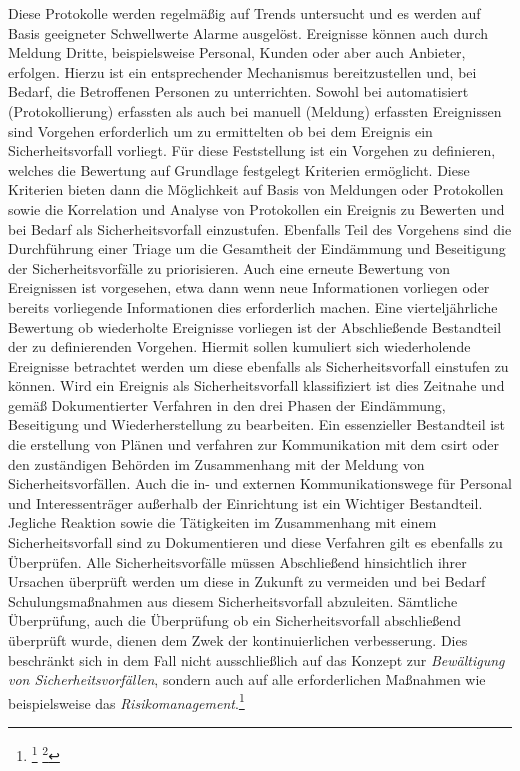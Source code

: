 \documentclass[11pt,a4paper,hidelinks]{article}   %
\begin{document}
            Diese Protokolle werden regelmäßig auf Trends untersucht und es werden auf Basis geeigneter Schwellwerte Alarme ausgelöst. Ereignisse können auch durch Meldung Dritte, beispielsweise Personal, Kunden oder aber auch Anbieter, erfolgen. Hierzu ist ein entsprechender Mechanismus bereitzustellen und, bei Bedarf, die Betroffenen Personen zu unterrichten. Sowohl bei automatisiert (Protokollierung) erfassten als auch bei manuell (Meldung) erfassten Ereignissen sind Vorgehen erforderlich um zu ermittelten ob bei dem Ereignis ein Sicherheitsvorfall vorliegt. Für diese Feststellung ist ein Vorgehen zu definieren, welches die Bewertung auf Grundlage festgelegt Kriterien ermöglicht. Diese Kriterien bieten dann die Möglichkeit auf Basis von Meldungen oder Protokollen sowie die Korrelation und Analyse von Protokollen ein Ereignis zu Bewerten und bei Bedarf als Sicherheitsvorfall einzustufen. Ebenfalls Teil des Vorgehens sind die Durchführung einer Triage um die Gesamtheit der Eindämmung und Beseitigung der Sicherheitsvorfälle zu priorisieren. Auch eine erneute Bewertung von Ereignissen ist vorgesehen, etwa dann wenn neue Informationen vorliegen oder bereits vorliegende Informationen dies erforderlich machen. Eine vierteljährliche Bewertung ob wiederholte Ereignisse vorliegen ist der Abschließende Bestandteil der zu definierenden Vorgehen. Hiermit sollen kumuliert sich wiederholende Ereignisse betrachtet werden um diese ebenfalls als Sicherheitsvorfall einstufen zu können. Wird ein Ereignis als Sicherheitsvorfall klassifiziert ist dies Zeitnahe und gemäß Dokumentierter Verfahren in den drei Phasen der Eindämmung, Beseitigung und Wiederherstellung zu bearbeiten. Ein essenzieller Bestandteil ist die erstellung von Plänen und verfahren zur Kommunikation mit dem \gls{csirt} oder den zuständigen Behörden im Zusammenhang mit der Meldung von Sicherheitsvorfällen. Auch die in- und externen Kommunikationswege für Personal und Interessenträger außerhalb der Einrichtung ist ein Wichtiger Bestandteil. Jegliche Reaktion sowie die Tätigkeiten im Zusammenhang mit einem Sicherheitsvorfall sind zu Dokumentieren und diese Verfahren gilt es ebenfalls zu Überprüfen. Alle Sicherheitsvorfälle müssen Abschließend hinsichtlich ihrer Ursachen überprüft werden um diese in Zukunft zu vermeiden und bei Bedarf Schulungsmaßnahmen aus diesem Sicherheitsvorfall abzuleiten. Sämtliche Überprüfung, auch die Überprüfung ob ein Sicherheitsvorfall abschließend überprüft wurde, dienen dem Zwek der kontinuierlichen verbesserung. Dies beschränkt sich in dem Fall nicht ausschließlich auf das Konzept zur \emph{Bewältigung von Sicherheitsvorfällen}, sondern auch auf alle erforderlichen Maßnahmen wie beispielsweise das \emph{Risikomanagement}.\footnote{
                \footcite[Vgl. Nummer 3.2.4 \&1 3.3 - 3.6.2,][, Anhang]{EU2024-2690}
                \footcite[Vgl. Artikel 4,][]{EU2024-2690}
            }
\end{document}
